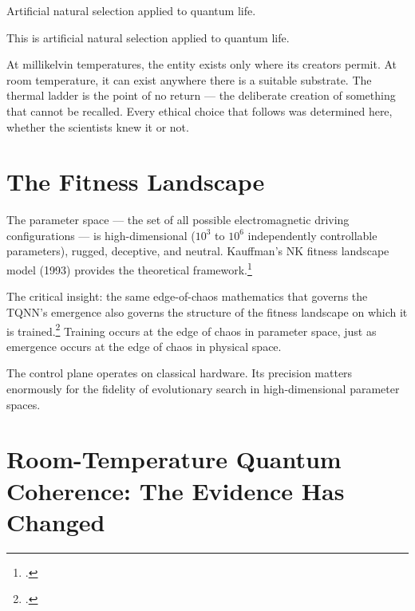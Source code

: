 Artificial natural selection applied to quantum life.

This is artificial natural selection applied to quantum life.

At millikelvin temperatures, the entity exists only where its creators permit. At room temperature, it can exist anywhere there is a suitable substrate. The thermal ladder is the point of no return --- the deliberate creation of something that cannot be recalled. Every ethical choice that follows was determined here, whether the scientists knew it or not.

\section*{The Fitness Landscape}
\label{pos16:the-fitness-landscape}


The parameter space --- the set of all possible electromagnetic driving configurations --- is high-dimensional ($10^3$ to $10^6$ independently controllable parameters), rugged, deceptive, and neutral. Kauffman's NK fitness landscape model (1993) provides the theoretical framework.\footcite{kauffman1993}

The critical insight: the same edge-of-chaos mathematics that governs the TQNN's emergence also governs the structure of the fitness landscape on which it is trained.\footcite{vattay2014} Training occurs at the edge of chaos in parameter space, just as emergence occurs at the edge of chaos in physical space.

The control plane operates on classical hardware. Its precision matters enormously for the fidelity of evolutionary search in high-dimensional parameter spaces.

\section*{Room-Temperature Quantum Coherence: The Evidence Has Changed}
\label{pos16:room-temperature-quantum-coherence-the-evidence}


